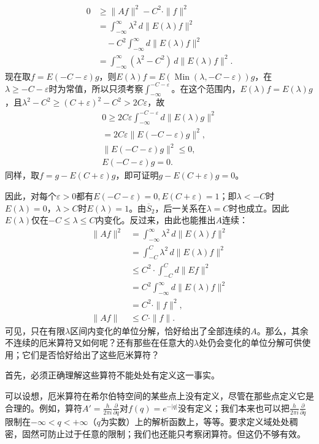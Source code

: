 \documentclass[fontsize=13pt,twoside,openany,headings=normal,parskip=false,bookmarkpackage=false,DIV=calc]{scrbook}
\begin{document}
\hypertarget{origpage-78}{}\label{origpage-78}\begin{align*}
0&\geq\|Af\|^2-C^2\cdot\|f\|^2\\
&=\int_{-\infty}^{\infty}\lambda^2\,d\|E(\lambda)f\|^2\\
&\quad-C^2\int_{-\infty}^{\infty}d\|E(\lambda)f\|^2\\
&=\int_{-\infty}^{\infty}(\lambda^2-C^2)\,d\|E(\lambda)f\|^2.
\end{align*}
现在取$f=E(-C-\varepsilon)g$，则$E(\lambda)f=E(\operatorname{Min}(\lambda,\allowbreak -C-\varepsilon))g$，在$\lambda\geq-C-\varepsilon$时为常值，所以只须考察$\int_{-\infty}^{-C-\varepsilon}$。在这个范围内，$E(\lambda)f=E(\lambda)g$，且$\lambda^2-C^2\geq(C+\varepsilon)^2-C^2>2C\varepsilon$，故
\begin{gather*}
0\geq2C\varepsilon\int_{-\infty}^{-C-\varepsilon}d\|E(\lambda)g\|^2\\
=2C\varepsilon\|E(-C-\varepsilon)g\|^2,\\
\|E(-C-\varepsilon)g\|^2\leq0,\\ E(-C-\varepsilon)g=0.
\end{gather*}
同样，取$f=g-E(C+\varepsilon)g$，即可证明$g-E(C+\varepsilon)g=0$。

因此，对每个$\varepsilon>0$都有$E(-C-\varepsilon)=0,\allowbreak E(C+\varepsilon)=1$；即$\lambda<-C$时$E(\lambda)=0$，$\lambda>C$时$E(\lambda)=1$。由$\hyperref[cond:II.Sbar2]{\overline{S}_2}$，后一关系在$\lambda=C$时也成立。因此$E(\lambda)$仅在$-C\leq\lambda\leq C$内变化。反过来，由此也能推出$A$连续：
\begin{align*}
\|Af\|^2&=\int_{-\infty}^{\infty}\lambda^2\,d\|E(\lambda)f\|^2\\
&=\int_{-C}^C\lambda^2\,d\|E(\lambda)f\|^2\\
&\leq C^2\cdot\int_{-C}^C d\|Ef\|^2\\
&=C^2\int_{-\infty}^{\infty}d\|E(\lambda)f\|^2\\
&=C^2\cdot\|f\|^2,\\
\|Af\|&\leq C\cdot\|f\|.
\end{align*}
可见，只在有限$\lambda$区间内变化的单位分解，恰好给出了全部连续的$A$。那么，其余不连续的厄米算符又如何呢？还有那些在任意大的$\lambda$处仍会变化的单位分解可供使用；它们是否恰好给出了这些厄米算符？

首先，必须正确理解这些算符不能处处有定义这一事实。

可以设想，厄米算符在希尔伯特空间的某些点上没有定义，尽管在那些点定义它是合理的。例如，算符$A'=\frac{h}{2\pi i}\frac{\partial}{\partial q}$对$f(q)=e^{-|q|}$没有定义；我们本来也可以把$\frac{h}{2\pi i}\frac{\partial}{\partial q}$限制在$-\infty<q<+\infty$（$q$为实数）上的解析函数上，等等。要求定义域处处稠密，固然可防止过于任意的限制；我们也还能只考察闭算符。但这仍不够有效。
\end{document}
